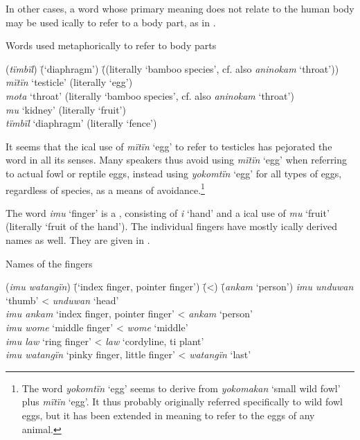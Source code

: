 In other cases, a word whose primary meaning does not relate to the human body may be used ically to refer to a body part, as in .

\ea%
    \label{ex:sem:18}
          Words used metaphorically to refer to body parts
\begin{tabbing}
{(\textit{tïmbïl})} \= {(‘diaphragm’)} \= {((literally ‘bamboo species’, cf. also \textit{aninokam} ‘throat’))}\kill
{\textit{mïtïn}} \> {‘testicle’} \> {(literally ‘egg’)}\\
{\textit{mota}} \> {‘throat’} \> {(literally ‘bamboo species’, cf. also \textit{aninokam} ‘throat’)}\\
{\textit{mu}} \> {‘kidney’} \> {(literally ‘fruit’)}\\
{\textit{tïmbïl}} \> {‘diaphragm’} \> {(literally ‘fence’)}
\end{tabbing}
\z

It seems that the ical use of \textit{mïtïn} ‘egg’ to refer to testicles has pejorated the word in all its senses. Many speakers thus avoid using \textit{mïtïn} ‘egg’ when referring to actual fowl or reptile eggs, instead using \textit{yokomtïn} ‘egg’ for all types of eggs, regardless of species, as a means of  avoidance.\footnote{The word \textit{yokomtïn} ‘egg’ seems to derive from \textit{yokomakan} ‘small wild fowl’ plus \textit{mïtïn} ‘egg’. It thus probably originally referred specifically to wild fowl eggs, but it has been extended in meaning to refer to the eggs of any animal.}

  The word \textit{imu} ‘finger’ is a , consisting of \textit{i} ‘hand’ and a ical use of \textit{mu} ‘fruit’ (literally ‘fruit of the hand’). The individual fingers have mostly ically derived names as well. They are given in .

\ea%
    \label{ex:sem:19}
          Names of the fingers
\begin{tabbing}
{(\textit{imu watangïn})} \= {(‘index finger, pointer finger’)} \= {(<)} \= {(\textit{ankam} ‘person’)}\kill
{\textit{imu unduwan}} \> {‘thumb’} \> {<} \> {\textit{unduwan} ‘head’}\\
{\textit{imu ankam}} \> {‘index finger, pointer finger’} \> {<} \> {\textit{ankam} ‘person’}\\
{\textit{imu wome}} \> {‘middle finger’} \> {<} \> {\textit{wome} ‘middle’}\\
{\textit{imu law}} \> {‘ring finger’} \> {<} \> {\textit{law} ‘cordyline, ti plant’}\\
{\textit{imu watangïn}} \> {‘pinky finger, little finger’} \> {<} \> {\textit{watangïn} ‘last’}
\end{tabbing}
\z

